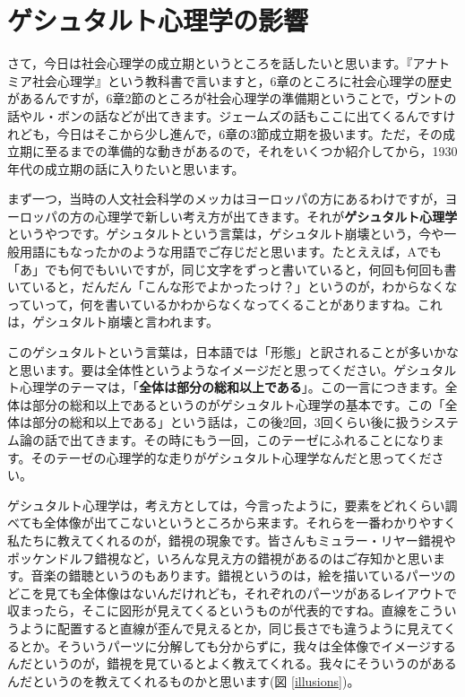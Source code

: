 \documentclass{ltjsbook}
\begin{document}
\section{ゲシュタルト心理学の影響}
さて，今日は社会心理学の成立期というところを話したいと思います。『アナトミア社会心理学』という教科書で言いますと，6章のところに社会心理学の歴史があるんですが，6章2節のところが社会心理学の準備期ということで，ヴントの話やル・ボンの話などが出てきます。ジェームズの話もここに出てくるんですけれども，今日はそこから少し進んで，6章の3節成立期を扱います。ただ，その成立期に至るまでの準備的な動きがあるので，それをいくつか紹介してから，1930年代の成立期の話に入りたいと思います。

まず一つ，当時の人文社会科学のメッカはヨーロッパの方にあるわけですが，ヨーロッパの方の心理学で新しい考え方が出てきます。それが\textbf{ゲシュタルト心理学}というやつです。ゲシュタルトという言葉は，ゲシュタルト崩壊という，今や一般用語にもなったかのような用語でご存じだと思います。たとええば，Aでも「あ」でも何でもいいですが，同じ文字をずっと書いていると，何回も何回も書いていると，だんだん「こんな形でよかったっけ？」というのが，わからなくなっていって，何を書いているかわからなくなってくることがありますね。これは，ゲシュタルト崩壊と言われます。

このゲシュタルトという言葉は，日本語では「形態」と訳されることが多いかなと思います。要は全体性というようなイメージだと思ってください。ゲシュタルト心理学のテーマは，「\textbf{全体は部分の総和以上である}」。この一言につきます。全体は部分の総和以上であるというのがゲシュタルト心理学の基本です。この「全体は部分の総和以上である」という話は，この後2回，3回くらい後に扱うシステム論の話で出てきます。その時にもう一回，このテーゼにふれることになります。そのテーゼの心理学的な走りがゲシュタルト心理学なんだと思ってください。

ゲシュタルト心理学は，考え方としては，今言ったように，要素をどれくらい調べても全体像が出てこないというところから来ます。それらを一番わかりやすく私たちに教えてくれるのが，錯視の現象です。皆さんもミュラー・リヤー錯視やポッケンドルフ錯視など，いろんな見え方の錯視があるのはご存知かと思います。音楽の錯聴というのもあります。錯視というのは，絵を描いているパーツのどこを見ても全体像はないんだけれども，それぞれのパーツがあるレイアウトで収まったら，そこに図形が見えてくるというものが代表的ですね。直線をこういうように配置すると直線が歪んで見えるとか，同じ長さでも違うように見えてくるとか。そういうパーツに分解しても分からずに，我々は全体像でイメージするんだというのが，錯視を見ているとよく教えてくれる。我々にそういうのがあるんだというのを教えてくれるものかと思います(図 \ref{illusions})。
\end{document}
